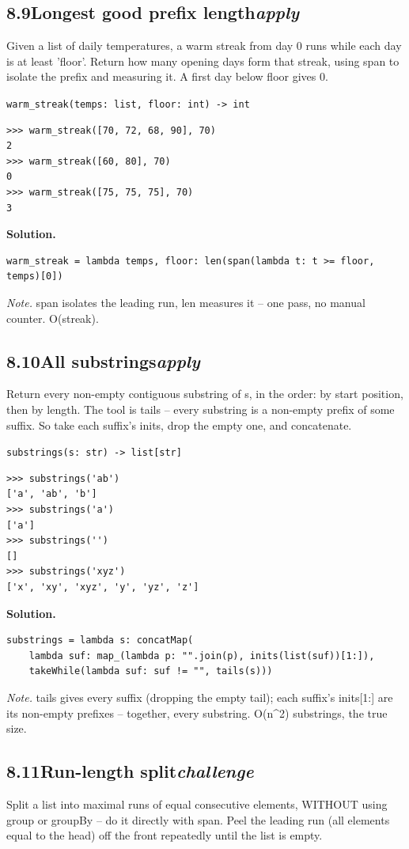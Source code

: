 \documentclass[10pt,letterpaper]{book}
\begin{document}
\subsection*{8.9\quad Longest good prefix length\hfill\textnormal{\textit{apply}}}
Given a list of daily temperatures, a warm streak from day 0 runs while each day is at least 'floor'. Return how many opening days form that streak, using span to isolate the prefix and measuring it. A first day below floor gives 0.

\noindent\texttt{warm\_streak(temps: list, floor: int) -> int}
\begin{lstlisting}[style=ex]
>>> warm_streak([70, 72, 68, 90], 70)
2
>>> warm_streak([60, 80], 70)
0
>>> warm_streak([75, 75, 75], 70)
3
\end{lstlisting}
\noindent\textbf{Solution.}
\begin{lstlisting}[style=code]
warm_streak = lambda temps, floor: len(span(lambda t: t >= floor, temps)[0])
\end{lstlisting}
\noindent\textit{Note.} span isolates the leading run, len measures it -- one pass, no manual counter. O(streak).

\subsection*{8.10\quad All substrings\hfill\textnormal{\textit{apply}}}
Return every non-empty contiguous substring of s, in the order: by start position, then by length. The tool is tails -- every substring is a non-empty prefix of some suffix. So take each suffix's inits, drop the empty one, and concatenate.

\noindent\texttt{substrings(s: str) -> list[str]}
\begin{lstlisting}[style=ex]
>>> substrings('ab')
['a', 'ab', 'b']
>>> substrings('a')
['a']
>>> substrings('')
[]
>>> substrings('xyz')
['x', 'xy', 'xyz', 'y', 'yz', 'z']
\end{lstlisting}
\noindent\textbf{Solution.}
\begin{lstlisting}[style=code]
substrings = lambda s: concatMap(
    lambda suf: map_(lambda p: "".join(p), inits(list(suf))[1:]),
    takeWhile(lambda suf: suf != "", tails(s)))
\end{lstlisting}
\noindent\textit{Note.} tails gives every suffix (dropping the empty tail); each suffix's inits[1:] are its non-empty prefixes -- together, every substring. O(n\^{}2) substrings, the true size.

\subsection*{8.11\quad Run-length split\hfill\textnormal{\textit{challenge}}}
Split a list into maximal runs of equal consecutive elements, WITHOUT using group or groupBy -- do it directly with span. Peel the leading run (all elements equal to the head) off the front repeatedly until the list is empty.
\end{document}

